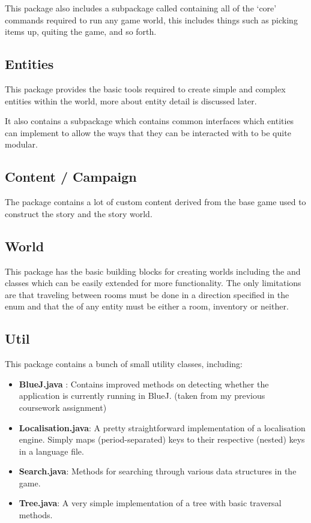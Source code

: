 \documentclass{article}
\begin{document}
\begin{multicols}{2}
            This package also includes a subpackage called  containing all of the `core' commands required to run any game world, this includes things such as picking items up, quiting the game, and so forth.
            
            \subsection{Entities}
            This package provides the basic tools required to create simple and complex entities within the world, more about entity detail is discussed later.

            It also contains a subpackage  which contains common interfaces which entities can implement to allow the ways that they can be interacted with to be quite modular.
            
            \subsection{Content / Campaign}
            The  package contains a lot of custom content derived from the base game used to construct the story and the story world.
            
            \subsection{World}
            This package has the basic building blocks for creating worlds including the  and  classes which can be easily extended for more functionality. The only limitations are that traveling between rooms must be done in a direction specified in the  enum and that the  of any entity must be either a room, inventory or neither.
            
            \subsection{Util}
            This package contains a bunch of small utility classes, including:

                \begin{itemize}[leftmargin=*]
                    \item \textbf{BlueJ.java} \cite{bluej}: Contains improved methods on detecting whether the application is currently running in BlueJ. (taken from my previous coursework assignment)
                    \item \textbf{Localisation.java}: A pretty straightforward implementation of a localisation engine. Simply maps (period-separated) keys to their respective (nested) keys in a language file.
                    \item \textbf{Search.java}: Methods for searching through various data structures in the game.
                    \item \textbf{Tree.java}: A very simple implementation of a tree with basic traversal methods.
                \end{itemize}


\end{multicols}
\end{document}
